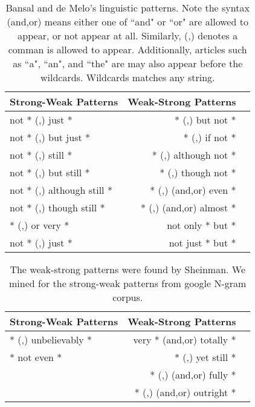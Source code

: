 \begin{table}
\small
\centering
\begin{tabular}{|l|rl|}
\hline \bf Strong-Weak Patterns & \bf Weak-Strong Patterns & \\ \hline
not  * (,) just *           &  * (,) but not *         & \\
not  * (,) but just *       &  * (,) if not *          & \\
not  * (,) still *          &  * (,) although not *    &  \\
not  * (,) but still *      &  * (,) though not *      & \\
not  * (,) although still * &  * (,) (and,or) even *   & \\
not  * (,) though still *   &  * (,) (and,or) almost * & \\
* (,) or very *             & not only * but *         & \\
not  * (,) just *           & not just * but *         & \\
\hline
\end{tabular}
\caption{\label{font-table} Bansal and de Melo's linguistic patterns. Note the syntax (and,or) means either one of ``and" or ``or" are allowed to appear, or not appear at all. Similarly, (,) denotes a comman is allowed to appear. Additionally, articles such as ``a", ``an", and ``the" are may also appear before the wildcards. Wildcards matches any string.}
\end{table}

\begin{table}
\small
\centering
\begin{tabular}{|l|rl|}
\hline \bf Strong-Weak Patterns & \bf Weak-Strong Patterns & \\ \hline
* (,) unbelievably *     &  very * (and,or) totally *   & \\
* not even *             &  * (,) yet still *           & \\
                         &  * (,) (and,or) fully *      & \\
                         &  * (,) (and,or) outright *   & \\
\hline
\end{tabular}
\caption{\label{font-table} The weak-strong patterns were found by Sheinman. We mined for the strong-weak patterns from google N-gram corpus.}
\end{table}\newpage